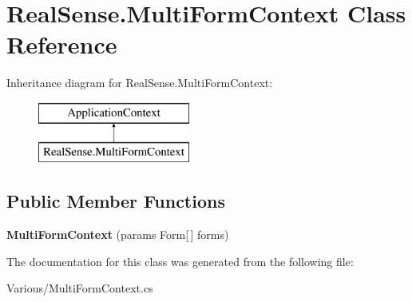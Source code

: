 \section{Real\+Sense.\+Multi\+Form\+Context Class Reference}
\label{class_real_sense_1_1_multi_form_context}
Inheritance diagram for Real\+Sense.\+Multi\+Form\+Context\+:\begin{figure}[H]
\begin{center}
\leavevmode
\includegraphics[height=2.000000cm]{class_real_sense_1_1_multi_form_context}
\end{center}
\end{figure}
\subsection*{Public Member Functions}
\begin{DoxyCompactItemize}
\item 
\mbox{\label{class_real_sense_1_1_multi_form_context_a509b28300a328d9fad769c6036f8af33}} 
{\bfseries Multi\+Form\+Context} (params Form[$\,$] forms)
\end{DoxyCompactItemize}


The documentation for this class was generated from the following file\+:\begin{DoxyCompactItemize}
\item 
Various/Multi\+Form\+Context.\+cs\end{DoxyCompactItemize}
